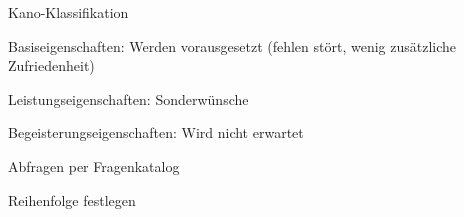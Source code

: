 \documentclass[a4paper]{article}
\begin{document}
\begin{multicols}{3}
\begin{itemize*}
\begin{itemize*}
\begin{itemize*}
                  \end{itemize*}
            \item Kano-Klassifikation
                  \begin{itemize*}
                    \item Basiseigenschaften: Werden vorausgesetzt (fehlen stört, wenig zusätzliche Zufriedenheit)
                    \item Leistungseigenschaften: Sonderwünsche
                    \item Begeisterungseigenschaften: Wird nicht erwartet
                    \item Abfragen per Fragenkatalog
                  \end{itemize*}
            \item Reihenfolge festlegen
          \end{itemize*}
  \end{itemize*}




\end{multicols}
\end{document}
